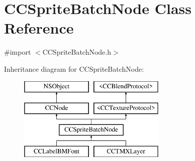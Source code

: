 \hypertarget{interface_c_c_sprite_batch_node}{\section{C\-C\-Sprite\-Batch\-Node Class Reference}
\label{interface_c_c_sprite_batch_node}
}


{\ttfamily \#import $<$C\-C\-Sprite\-Batch\-Node.\-h$>$}

Inheritance diagram for C\-C\-Sprite\-Batch\-Node\-:\begin{figure}[H]
\begin{center}
\leavevmode
\includegraphics[height=4.000000cm]{interface_c_c_sprite_batch_node}
\end{center}
\end{figure}

